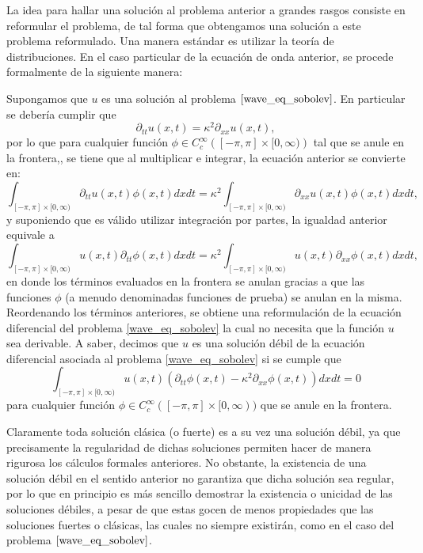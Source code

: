 \documentclass[letterpaper,twoside,12pt]{book}
\newcommand{\1}{\mathds{1}}
\theoremstyle{definition}
\theoremstyle{definition}
\theoremstyle{definition}
\theoremstyle{definition}
\theoremstyle{definition}
\theoremstyle{definition}
\theoremstyle{definition}
\begin{document}
La idea para hallar una solución al problema anterior a grandes rasgos consiste en reformular el problema, de tal forma que obtengamos una solución a este problema reformulado. Una manera estándar es utilizar la teoría de distribuciones. En el caso particular de la ecuación de onda anterior, se procede formalmente de la siguiente manera:

Supongamos que $u$ es una solución al problema $\eqref{wave_eq_sobolev}$. En particular se debería cumplir que 
\[
\partial_{tt}u(x,t)=\kappa^2\partial_{xx}u(x,t),
\]
por lo que para cualquier función $\phi\in C^{\infty}_c\left([-\pi,\pi]\times [0,\infty)\right)$ tal que se anule en la frontera,, se tiene que al multiplicar e integrar, la ecuación anterior se convierte en:
\[
    \int_{[-\pi,\pi]\times [0,\infty)}\partial_{tt}u(x,t)\phi(x,t)dx dt=\kappa^2\int_{[-\pi,\pi]\times [0,\infty)}\partial_{xx}u(x,t)\phi(x,t)dx dt,
\]
y suponiendo que es válido utilizar integración por partes, la igualdad anterior equivale a
\[
\int_{[-\pi,\pi]\times [0,\infty)}u(x,t)\partial_{tt}\phi(x,t)dx dt=\kappa^2\int_{[-\pi,\pi]\times [0,\infty)}u(x,t)\partial_{xx}\phi(x,t)dx dt,
\]
en donde los términos evaluados en la frontera se anulan gracias a que las funciones $\phi$ (a menudo denominadas funciones de prueba) se anulan en la misma. Reordenando los términos anteriores, se obtiene una reformulación de la ecuación diferencial del problema \eqref{wave_eq_sobolev} la cual no necesita que la función $u$ sea derivable. A saber, decimos que $u$ es una solución débil de la ecuación diferencial asociada al problema \eqref{wave_eq_sobolev} si se cumple que 
\[
\int_{[-\pi,\pi]\times [0,\infty)}u(x,t)(\partial_{tt}\phi(x,t)-\kappa^2\partial_{xx}\phi(x,t))dx dt=0    
\]
para cualquier función $\phi\in C^{\infty}_c([-\pi,\pi]\times [0,\infty))$ que se anule en la frontera.

Claramente toda solución clásica (o fuerte) es a su vez una solución débil, ya que precisamente la regularidad de dichas soluciones permiten hacer de manera rigurosa los cálculos formales anteriores.
No obstante, la existencia de una solución débil en el sentido anterior no garantiza que dicha solución sea regular, por lo que en principio es más sencillo demostrar la existencia o unicidad de las soluciones débiles, a pesar de que estas gocen de menos propiedades que las soluciones fuertes o clásicas, las cuales no siempre existirán, como en el caso del problema $\eqref{wave_eq_sobolev}$.
\end{document}
